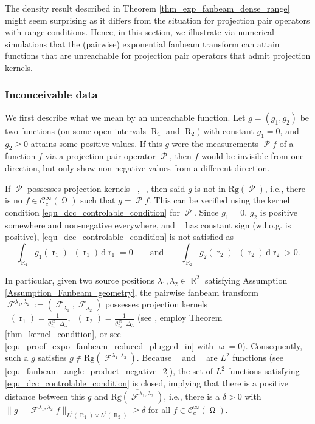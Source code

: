 \documentclass[12pt]{article}
\DeclareMathOperator{\RR}{{\mathbb{R}}}
\DeclareMathOperator{\Proj}{\mathcal{P}}
\newcommand{\dd}[1]{\,\mathrm{d}{#1}}
\newcommand{\rg}[1]{\mathrm{Rg}({#1})}
\DeclareMathOperator{\Fanbeam}{\mathcal{F}}
\DeclareMathOperator{\rotated}{\,\circlearrowleft}
\DeclareMathOperator{\rayvariable}{r}
\DeclareMathOperator{\raygroundset}{R}
\DeclareMathOperator{\Vone}{V_1}
\DeclareMathOperator{\Vtwo}{V_2}
\DeclareMathOperator{\attenuation}{\omega}
\DeclareMathOperator{\imgdom}{{\Omega}}
\begin{document}
 \label{example_surjectivity}


The density result described in Theorem \ref{thm_exp_fanbeam_dense_range} might seem surprising as it differs from the situation for projection pair operators with range conditions. Hence, in this section, we illustrate via numerical simulations that the (pairwise) exponential fanbeam transform can attain functions that are unreachable for projection pair operators that admit projection kernels.

\subsubsection*{Inconceivable data}
We first describe what we mean by an unreachable function.
Let $g=(g_1,g_2)$ be two functions (on some open intervals $\raygroundset_1$ and $\raygroundset_2$) with constant $g_1=0$, and $g_2\geq 0$ attains some positive values. If this $g$ were the measurements $\Proj f$ of a function $f$ via a projection pair operator $\Proj$, then $f$ would be invisible from one direction, but only show non-negative values from a different direction.

If $\Proj$ possesses projection kernels $\Vone,\Vtwo$, then said $g$ is not in $\rg{\Proj}$, i.e.,  there is no $f\in \mathcal{C}^\infty_c(\imgdom)$ such that  $g=\Proj f$.
This can be verified using the kernel condition \eqref{equ_dcc_controlable_condition} for $\Proj$. 
Since $g_1=0$, $g_2$ is positive somewhere and non-negative everywhere, and $\Vtwo$ has constant sign (w.l.o.g. is positive), \eqref{equ_dcc_controlable_condition} is not satisfied as
\begin{equation}
\int_{\raygroundset_1} g_1(\rayvariable_1) \Vone(\rayvariable_1) \dd {\rayvariable_1} = 0 \qquad \text{and}  \qquad \int_{\raygroundset_2} g_2(\rayvariable_2) \Vtwo(\rayvariable_2) \dd {\rayvariable_2}>0.
\end{equation} 
 
In particular, given two source positions $\lambda_1,\lambda_2\in \RR^2$ satisfying Assumption \ref{Assumption_Fanbeam_geometry}, the pairwise fanbeam transform $\Fanbeam^{\lambda_1,\lambda_2}:=(\Fanbeam_{\lambda_1},\Fanbeam_{\lambda_2})$ possesses projection kernels $\Vone(\rayvariable_1) = \frac{1}{\vartheta_{\rayvariable_1}^{\rotated} \cdot \Delta_\lambda},\Vtwo(\rayvariable_2)=\frac{1}{\vartheta_{\rayvariable_2}^{\rotated} \cdot \Delta_\lambda}$ (see \cite{doi:10.1080/01630568308816147}, employ Theorem \ref{thm_kernel_condition}, or see \eqref{equ_proof_expo_fanbeam_reduced_plugged_in} with $\attenuation=0$). Consequently, such a $g$ satisfies $g\not \in \rg{\Fanbeam^{\lambda_1,\lambda_2}}$. Because $\Vone$ and $\Vtwo$ are $L^2$ functions (see \eqref{equ_fanbeam_angle_product_negative_2}), the set of $L^2$ functions satisfying \eqref{equ_dcc_controlable_condition} is closed, implying
that there is a positive distance between this $g$ and $\overline {\rg{\Fanbeam^{\lambda_1,\lambda_2}}}$, i.e., there is a $\delta>0$ with $\|g-\Fanbeam^{\lambda_1,\lambda_2} f\|_{L^2(\raygroundset_1)\times L^2(\raygroundset_2)}\geq \delta$ for all $f\in \mathcal{C}^\infty_c(\imgdom)$. 
 
\end{document}
